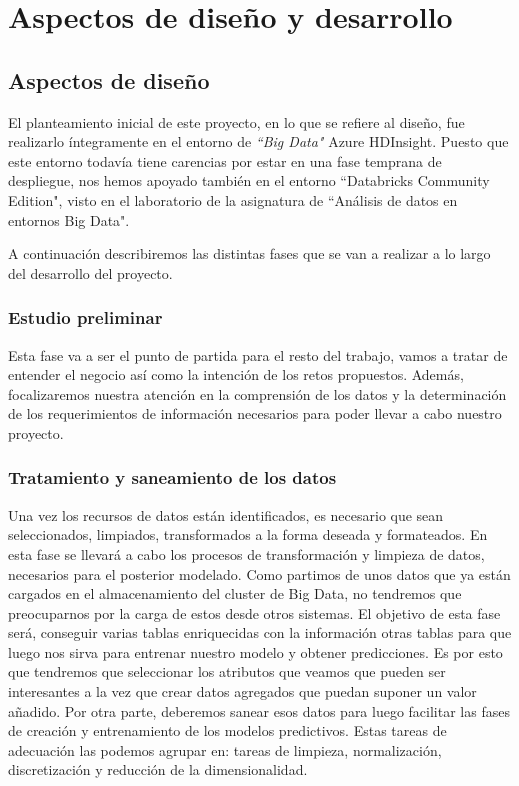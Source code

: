 \chapter{Aspectos de diseño y desarrollo}
\label{chapter:disenyo_y_desarrollo}


\section{Aspectos de diseño}
El planteamiento inicial de este proyecto, en lo que se refiere al diseño, fue realizarlo íntegramente en el entorno de \textit{``Big Data"} Azure HDInsight.
Puesto que este entorno todavía tiene carencias por estar en una fase temprana de despliegue, nos hemos apoyado también en el entorno ``Databricks Community Edition"\cite{databricks}, visto en el laboratorio de la asignatura de ``Análisis de datos en entornos Big Data".

A continuación describiremos las distintas fases que se van a realizar a lo largo del desarrollo del proyecto.

\subsection{Estudio preliminar}
Esta fase va a ser el punto de partida para el resto del trabajo, vamos a tratar de entender el negocio así como la intención de los retos propuestos.
Además, focalizaremos nuestra atención en la comprensión de los datos y la determinación de los requerimientos de información necesarios para poder llevar a cabo nuestro proyecto.

\subsection{Tratamiento y saneamiento de los datos}
Una vez los recursos de datos están identificados, es necesario que sean seleccionados, limpiados, transformados a la forma deseada y formateados. En esta fase se llevará a cabo los procesos de transformación y limpieza de datos, necesarios para el posterior modelado.
Como partimos de unos datos que ya están cargados en el almacenamiento del cluster de Big Data, no tendremos que preocuparnos por la carga de estos desde otros sistemas.
El objetivo de esta fase será, conseguir varias tablas enriquecidas con la información otras tablas para que luego nos sirva para entrenar nuestro modelo y obtener predicciones.
Es por esto que tendremos que seleccionar los atributos que veamos que pueden ser interesantes a la vez que crear datos agregados que puedan suponer un valor añadido.
Por otra parte, deberemos sanear esos datos para luego facilitar las fases de creación y entrenamiento de los modelos predictivos. Estas tareas de adecuación las podemos agrupar en: tareas de limpieza, normalización, discretización y reducción de la dimensionalidad.  

